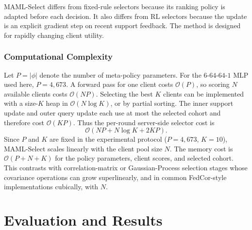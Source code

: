 \documentclass[journal]{IEEEtran}
\newcommand{\revision}[1]{#1}
\begin{document}
\revision{MAML-Select differs from fixed-rule selectors because its ranking policy is adapted before each decision. It also differs from RL selectors because the update is an explicit gradient step on recent support feedback. The method is designed for rapidly changing client utility.}

\subsubsection{Computational Complexity}
\revision{Let $P=|\phi|$ denote the number of meta-policy parameters. For the $6$-$64$-$64$-$1$ MLP used here, $P=4{,}673$. A forward pass for one client costs $\mathcal{O}(P)$, so scoring $N$ available clients costs $\mathcal{O}(NP)$. Selecting the best $K$ clients can be implemented with a size-$K$ heap in $\mathcal{O}(N\log K)$, or by partial sorting. The inner support update and outer query update each use at most the selected cohort and therefore cost $\mathcal{O}(KP)$. Thus the per-round server-side selector cost is}
\begin{equation}
	\mathcal{O}\!\left(NP + N\log K + 2KP\right).
	\label{eq:selector_complexity}
\end{equation}
\revision{Since $P$ and $K$ are fixed in the experimental protocol ($P=4{,}673$, $K=10$), MAML-Select scales linearly with the client pool size $N$. The memory cost is $\mathcal{O}(P+N+K)$ for the policy parameters, client scores, and selected cohort. This contrasts with correlation-matrix or Gaussian-Process selection stages whose covariance operations can grow superlinearly, and in common FedCor-style implementations cubically, with $N$.}

\section{Evaluation and Results}
\end{document}
